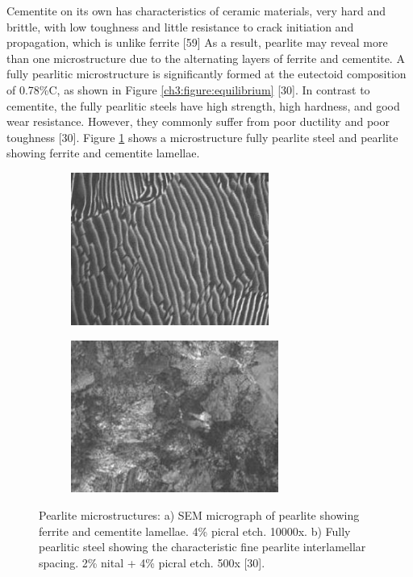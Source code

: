 \documentclass[12pt]{report}
\begin{document}
Cementite on its own has characteristics of ceramic materials, very hard and brittle, with low toughness and little resistance to crack initiation and propagation, which is unlike ferrite [59] As a result, pearlite may reveal more than one microstructure due to the alternating layers of ferrite and cementite. A fully pearlitic microstructure is significantly formed at the eutectoid composition of 0.78\%C, as shown in Figure \ref{ch3:figure:equilibrium} [30]. In contrast to cementite, the fully pearlitic steels have high strength, high hardness, and good wear resistance. However, they commonly suffer from poor ductility and poor toughness [30]. Figure \ref{ch3:figure:pearlite:microstructures} shows a microstructure fully pearlite steel and pearlite showing ferrite and cementite lamellae.

\begin{figure}[H]

\centering
\begin{subfigure}{.45\textwidth}
    \centering
    \includegraphics[height=5cm,width=\textwidth]{ferrite_and_cementite_lamellae_micrograph.jpg}
    \caption{}
\end{subfigure}
\begin{subfigure}{.45\textwidth}
    \centering
    \includegraphics[height=5cm,width=\textwidth]{fully_pearlitic_steel.jpg}
    \caption{}
\end{subfigure}

\caption{Pearlite microstructures:  a) SEM micrograph of pearlite showing ferrite and cementite lamellae. 4\% picral etch. 10000x. b) Fully pearlitic steel showing the characteristic fine pearlite interlamellar spacing. 2\% nital + 4\% picral etch. 500x [30].}
\label{ch3:figure:pearlite:microstructures}
\end{figure}
\end{document}
